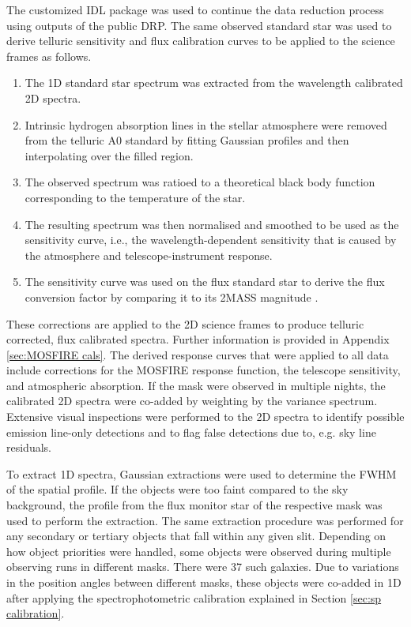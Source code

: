 \documentclass[iop]{emulateapj}
\begin{document}
The customized IDL package was used to continue the data reduction process using outputs of the public DRP. The same observed standard star was used to derive telluric sensitivity and flux calibration curves  to be applied to the science frames as follows.
\begin{enumerate}
\item The 1D standard star spectrum was extracted from the wavelength calibrated 2D spectra.
\item Intrinsic hydrogen absorption lines in the stellar atmosphere  were removed from the telluric A0 standard by fitting Gaussian profiles and then  interpolating over the filled region. 
\item The observed spectrum was ratioed to a theoretical black body function corresponding to the temperature of the star.
\item The resulting spectrum was then normalised and smoothed to be used as the sensitivity curve, i.e., the wavelength-dependent sensitivity that is caused by the atmosphere and telescope-instrument response. 
\item The sensitivity curve was used on the flux standard star to derive the flux conversion factor by comparing it to its 2MASS magnitude \citep{Skrutskie2006}.
\end{enumerate}
These corrections are applied to the 2D science frames to produce telluric corrected, flux calibrated spectra. 
Further information is provided in Appendix \ref{sec:MOSFIRE cals}.  
The derived response curves that were applied to all data include corrections for the MOSFIRE response function, the telescope sensitivity, and atmospheric absorption. 
If the mask were observed in multiple nights, the calibrated 2D spectra were co-added by weighting by the variance spectrum.  Extensive visual inspections were performed to the 2D spectra to identify possible emission line-only detections and to flag false detections due to, e.g. sky line residuals. 


To extract 1D spectra, Gaussian extractions were used to determine the FWHM of the spatial profile. If the objects were too faint compared to the sky background, the profile from the flux monitor star of the respective mask was used to perform the extraction. 
The same extraction procedure was performed for any secondary or tertiary objects that fall within any given slit.
Depending on how object priorities were handled, some objects were observed during multiple observing runs in different masks. There were 37 such galaxies.  
Due to variations in the position angles between different masks, these objects were co-added in 1D after applying the spectrophotometric calibration explained in Section \ref{sec:sp calibration}. 
\end{document}
